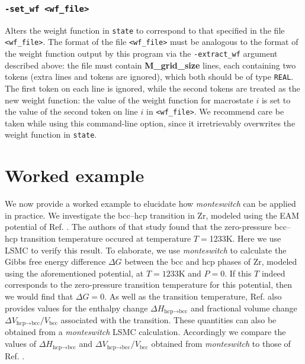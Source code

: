 \documentclass{report}
\begin{document}
\subsection{\texttt{-set\_wf <wf\_file>}}
Alters the weight function in \texttt{state} to correspond to that specified in the file \texttt{<wf\_file>}. The format of the file
\texttt{<wf\_file>} must be analogous to the format of the weight function output by this program via the \texttt{-extract\_wf} argument
described above: the file must contain \textbf{M\_grid\_size} lines, each containing two tokens (extra lines and tokens are ignored),
which both should be of type \texttt{REAL}. The first token on each line is ignored, while the second tokens are treated as the new
weight function: the value of the weight function for macrostate $i$ is set to the value of the second token on line $i$ in
\texttt{<wf\_file>}. We recommend care be taken while using this command-line option, since it irretrievably overwrites the weight 
function in \texttt{state}.


\chapter{Worked example}\label{chapter:example}
We now provide a worked example to elucidate how \emph{monteswitch} can be applied in practice. We investigate the bcc--hcp
transition in Zr, modeled using the EAM potential of Ref. \cite{Mendelev_2007}. The authors of that study found that the zero-pressure bcc--hcp
transition temperature occured at temperature $T=$1233K. Here we use LSMC to verify this result. To elaborate, we
use \emph{monteswitch} to calculate the Gibbs free energy difference $\Delta G$ between the bcc and hcp phases of Zr, modeled using 
the aforementioned potential, at $T=1233$K and $P=0$. If this $T$ indeed corresponds to the zero-pressure transition temperature for this potential,
then we would find that $\Delta G=0$. As well as the transition temperature, Ref. \cite{Mendelev_2007} also provides values for the enthalpy change 
$\Delta H_{\text{hcp$\to$bcc}}$ and fractional volume change $\Delta V_{\text{hcp$\to$bcc}}/V_{\text{bcc}}$ associated with the transition. These 
quantities can also be obtained from a \emph{monteswitch} LSMC calculation. Accordingly we compare the values of $\Delta H_{\text{hcp$\to$bcc}}$ and
$\Delta V_{\text{hcp$\to$bcc}}/V_{\text{bcc}}$ obtained from \emph{monteswitch} to those of Ref. \cite{Mendelev_2007}.
\end{document}
